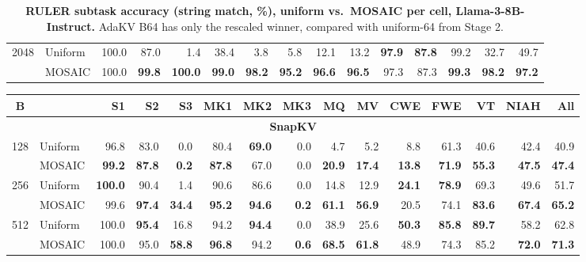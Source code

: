\begin{table}[tp]
\begin{tabular}{@{} c l rrrrrrrrrrrrr @{}}
    \cmidrule(l){1-15}
    \multirow{2}{*}{2048} & Uniform & 100.0 & 87.0 & 1.4 & 38.4 & 3.8 & 5.8 & 12.1 & 13.2 & \textbf{97.9} & \textbf{87.8} & 99.2 & 32.7 & 49.7 \\
     & MOSAIC & 100.0 & \textbf{99.8} & \textbf{100.0} & \textbf{99.0} & \textbf{98.2} & \textbf{95.2} & \textbf{96.6} & \textbf{96.5} & 97.3 & 87.3 & \textbf{99.3} & \textbf{98.2} & \textbf{97.2} \\
    \bottomrule
  \end{tabular}
  \caption{\textbf{RULER subtask accuracy (string match, \%), uniform vs.\ MOSAIC per cell, Llama-3-8B-Instruct.} AdaKV B64 has only the rescaled winner, compared with uniform-64 from Stage 2.}
  \label{tab:app-ruler}
\end{table}

\begin{table}[tp]
  \centering
  \scriptsize
  \setlength{\tabcolsep}{4pt}
  \renewcommand{\arraystretch}{0.92}
  \begin{tabular}{@{} c l rrrrrrrrrrrrr @{}}
    \toprule
    \textbf{B} & & \textbf{S1} & \textbf{S2} & \textbf{S3} & \textbf{MK1} & \textbf{MK2} & \textbf{MK3} & \textbf{MQ} & \textbf{MV} & \textbf{CWE} & \textbf{FWE} & \textbf{VT} & \textbf{NIAH} & \textbf{All} \\
    \midrule
    \multicolumn{15}{c}{\textbf{SnapKV}} \\
    \midrule
    \multirow{2}{*}{128} & Uniform & 96.8 & 83.0 & 0.0 & 80.4 & \textbf{69.0} & 0.0 & 4.7 & 5.2 & 8.8 & 61.3 & 40.6 & 42.4 & 40.9 \\
     & MOSAIC & \textbf{99.2} & \textbf{87.8} & \textbf{0.2} & \textbf{87.8} & 67.0 & 0.0 & \textbf{20.9} & \textbf{17.4} & \textbf{13.8} & \textbf{71.9} & \textbf{55.3} & \textbf{47.5} & \textbf{47.4} \\
    \cmidrule(l){1-15}
    \multirow{2}{*}{256} & Uniform & \textbf{100.0} & 90.4 & 1.4 & 90.6 & 86.6 & 0.0 & 14.8 & 12.9 & \textbf{24.1} & \textbf{78.9} & 69.3 & 49.6 & 51.7 \\
     & MOSAIC & 99.6 & \textbf{97.4} & \textbf{34.4} & \textbf{95.2} & \textbf{94.6} & \textbf{0.2} & \textbf{61.1} & \textbf{56.9} & 20.5 & 74.1 & \textbf{83.6} & \textbf{67.4} & \textbf{65.2} \\
    \cmidrule(l){1-15}
    \multirow{2}{*}{512} & Uniform & 100.0 & \textbf{95.4} & 16.8 & 94.2 & \textbf{94.4} & 0.0 & 38.9 & 25.6 & \textbf{50.3} & \textbf{85.8} & \textbf{89.7} & 58.2 & 62.8 \\
     & MOSAIC & 100.0 & 95.0 & \textbf{58.8} & \textbf{96.8} & 94.2 & \textbf{0.6} & \textbf{68.5} & \textbf{61.8} & 48.9 & 74.3 & 85.2 & \textbf{72.0} & \textbf{71.3} \\

\end{tabular}
\end{table}
